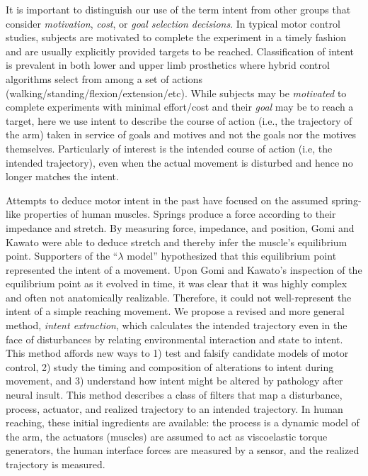 \documentclass[10pt]{article}
\begin{document}
It is important to distinguish our use of the term intent from other groups that consider \textit{motivation}\cite{mcclelland1985motives, rawolle2013relationships}, \textit{cost}\cite{todorov2002optimal, flash1985coordination}, or \textit{goal selection decisions}\cite{ziebart2010modeling}. In typical motor control studies, subjects are motivated to complete the experiment in a timely fashion and are usually explicitly provided targets to be reached. Classification of intent is prevalent in both lower \cite{strausser2011development, hargrove2013robotic} and upper limb\cite{englehart2003robust, young2012improving} prosthetics where hybrid control algorithms select from among a set of actions (walking/standing/flexion/extension/etc). While subjects may be \textit{motivated} to complete experiments with minimal effort/cost and their \textit{goal} may be to reach a target, here we use intent to describe the course of action (i.e., the trajectory of the arm) taken in service of goals and motives and not the goals nor the motives themselves. Particularly of interest is the intended course of action (i.e, the intended trajectory), even when the actual movement is disturbed and hence no longer matches the intent.

Attempts to deduce motor intent in the past have focused on the assumed spring-like properties of human muscles. Springs produce a force according to their impedance and stretch. By measuring force, impedance, and position, Gomi and Kawato\cite{gomi1997human} were able to deduce stretch and thereby infer the muscle's equilibrium point. Supporters of the ``$\lambda$ model''\cite{feldman1995origin} hypothesized that this equilibrium point represented the intent of a movement. Upon Gomi and Kawato's inspection of the equilibrium point as it evolved in time, it was clear that it was highly complex and often not anatomically realizable. Therefore, it could not well-represent the intent of a simple reaching movement. We propose a revised and more general method, \textit{intent extraction}, which calculates the intended trajectory even in the face of disturbances by relating environmental interaction and state to intent. This method affords new ways to 1) test and falsify candidate models of motor control, 2) study the timing and composition of alterations to intent during movement, and 3) understand how intent might be altered by pathology after neural insult. This method describes a class of filters that map a disturbance, process, actuator, and realized trajectory to an intended trajectory. In human reaching, these initial ingredients are available: the process is a dynamic model of the arm, the actuators (muscles) are assumed to act as viscoelastic torque generators, the human interface forces are measured by a sensor, and the realized trajectory is measured.
\end{document}
